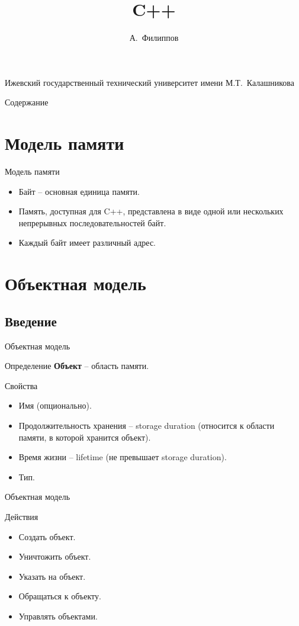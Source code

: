 \documentclass[xetex,mathserif,serif,10pt]{beamer}
\begin{document}
    \title[C++]{C++}
    \author[Филиппов]{А.~Филиппов}
    \institute
    {
        Ижевский государственный технический университет имени М.Т.~Калашникова
    }
    \frame{\titlepage}
    \begin{frame}{Содержание}
        \tableofcontents
    \end{frame}
    \section{Модель памяти}
    \begin{frame}{Модель памяти}
        \begin{itemize}
            \item Байт -- основная единица памяти.
            \item Память, доступная для C++, представлена в виде одной или нескольких непрерывных последовательностей байт.
            \item Каждый байт имеет различный адрес.
        \end{itemize}
    \end{frame}
    \section{Объектная модель}
    \subsection{Введение}
    \begin{frame}{Объектная модель}
        \begin{block}{Определение}
            \textbf{Объект} -- область памяти.
        \end{block}
        \begin{block}{Свойства}
            \begin{itemize}
                \item Имя (опционально).
                \item Продолжительность хранения -- storage duration (относится к области памяти, в которой хранится объект).
                \item Время жизни -- lifetime (не превышает storage duration).
                \item Тип.
            \end{itemize}
        \end{block}
    \end{frame}
    \begin{frame}{Объектная модель}
        \begin{block}{Действия}
            \begin{itemize}
                \item Создать объект.
                \item Уничтожить объект.
                \item Указать на объект.
                \item Обращаться к объекту.
                \item Управлять объектами.
            \end{itemize}
        \end{block}
    \end{frame}
\end{document}
